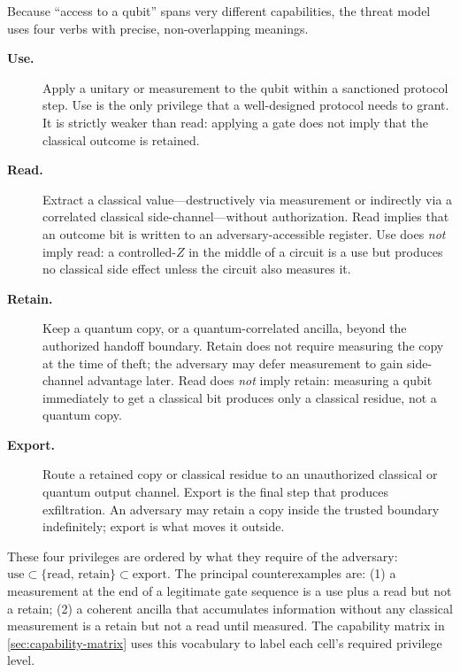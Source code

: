 Because ``access to a qubit'' spans very different capabilities, the threat
model uses four verbs with precise, non-overlapping meanings.

\begin{description}
  \item[\textbf{Use.}] Apply a unitary or measurement to the qubit within a
  sanctioned protocol step. Use is the only privilege that a well-designed
  protocol needs to grant. It is strictly weaker than read: applying a gate does
  not imply that the classical outcome is retained.

  \item[\textbf{Read.}] Extract a classical value—destructively via measurement
  or indirectly via a correlated classical side-channel—without authorization.
  Read implies that an outcome bit is written to an adversary-accessible
  register. Use does \emph{not} imply read: a controlled-$Z$ in the middle of a
  circuit is a use but produces no classical side effect unless the circuit also
  measures it.

  \item[\textbf{Retain.}] Keep a quantum copy, or a quantum-correlated ancilla,
  beyond the authorized handoff boundary. Retain does not require measuring the
  copy at the time of theft; the adversary may defer measurement to gain
  side-channel advantage later. Read does \emph{not} imply retain: measuring a
  qubit immediately to get a classical bit produces only a classical residue, not
  a quantum copy.

  \item[\textbf{Export.}] Route a retained copy or classical residue to an
  unauthorized classical or quantum output channel. Export is the final step that
  produces exfiltration. An adversary may retain a copy inside the trusted
  boundary indefinitely; export is what moves it outside.
\end{description}

These four privileges are ordered by what they require of the adversary:
$\text{use} \subset \{\text{read, retain}\} \subset \text{export}$. The
principal counterexamples are: (1) a measurement at the end of a legitimate gate
sequence is a use plus a read but not a retain; (2) a coherent ancilla that
accumulates information without any classical measurement is a retain but not a
read until measured. The capability matrix in \cref{sec:capability-matrix} uses
this vocabulary to label each cell's required privilege level.
